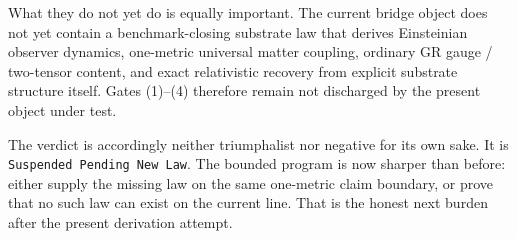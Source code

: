 \documentclass[11pt]{article}
\begin{document}
What they do not yet do is equally important. The current bridge object does not yet contain a benchmark-closing substrate law that derives Einsteinian observer dynamics, one-metric universal matter coupling, ordinary GR gauge / two-tensor content, and exact relativistic recovery from explicit substrate structure itself. Gates (1)--(4) therefore remain not discharged by the present object under test.

The verdict is accordingly neither triumphalist nor negative for its own sake. It is \texttt{Suspended Pending New Law}. The bounded program is now sharper than before: either supply the missing law on the same one-metric claim boundary, or prove that no such law can exist on the current line. That is the honest next burden after the present derivation attempt.
\end{document}
